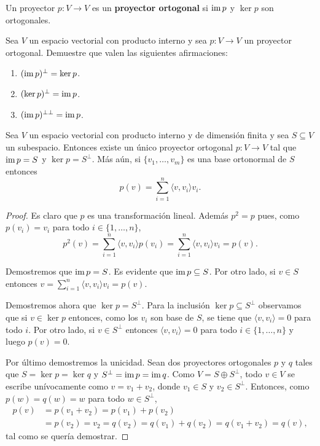 \begin{block}
	Un proyector $p\colon V\to V$ es un \textbf{proyector ortogonal} si $\operatorname{im} p$
	y $\ker p$ son ortogonales. 
\end{block}

\begin{xca}
	\label{xca:proyector_ortogonal}
	Sea $V$ un espacio vectorial con producto interno y sea $p\colon V\to V$ un
	proyector ortogonal. Demuestre que valen las siguientes afirmaciones:
	\begin{enumerate}
		\item $(\operatorname{im} p)^\perp=\ker p$.
		\item $(\ker p)^\perp=\operatorname{im} p$.
		\item $(\operatorname{im} p)^{\perp\perp}=\operatorname{im} p$. 
	\end{enumerate}
\end{xca}

\begin{prop}
	Sea $V$ un espacio vectorial con producto interno y de dimensión finita y sea
	$S\subseteq V$ un subespacio. Entonces existe un único proyector ortogonal
	$p\colon V\to V$ tal que $\operatorname{im} p=S$ y $\ker p=S^\perp$. Más aún, si
	$\{v_1,\dots,v_m\}$ es una base ortonormal de $S$ entonces
	\[
		p(v)=\sum_{i=1}^n\langle v,v_i\rangle v_i.
	\]

	\begin{proof}
		Es claro que $p$ es una transformación lineal. Además $p^2=p$ pues,
		como $p(v_i)=v_i$ para todo $i\in\{1,\dots,n\}$, 
		\[
			p^2(v)=\sum_{i=1}^n\langle v,v_i\rangle p(v_i)=\sum_{i=1}^n\langle v,v_i\rangle v_i=p(v).
		\]

		Demostremos que $\operatorname{im} p=S$. Es evidente que $\operatorname{im} p\subseteq S$. Por otro
		lado, si $v\in S$ entonces $v=\sum_{i=1}^n \langle v,v_i\rangle
		v_i=p(v)$. 

		Demostremos ahora que $\ker p=S^\perp$. Para la inclusión $\ker
		p\subseteq S^\perp$ observamos que si $v\in \ker p$ entonces, como los
		$v_i$ son base de $S$, se tiene que $\langle v,v_i\rangle=0$ para todo
		$i$. Por otro lado, si $v\in S^\perp$ entonces $\langle v,v_i\rangle=0$
		para todo $i\in\{1,\dots,n\}$ y luego $p(v)=0$. 

		Por último demostremos la unicidad. Sean dos proyectores 
		ortogonales $p$ y $q$ tales que $S=\ker p=\ker q$ y $S^\perp=\operatorname{im} p=\operatorname{im} q$. 
		Como $V=S\oplus S^\perp$, todo $v\in V$ se escribe unívocamente como
		$v=v_1+v_2$, donde $v_1\in S$ y $v_2\in S^\perp$. Entonces, como
		$p(w)=q(w)=w$ para todo $w\in S^\perp$, 
		\begin{align*}
			p(v)&=p(v_1+v_2)=p(v_1)+p(v_2)\\
			&=p(v_2)=v_2=q(v_2)=q(v_1)+q(v_2)=q(v_1+v_2)=q(v),
		\end{align*}
		tal como se quería demostrar.
	\end{proof}
\end{prop}


